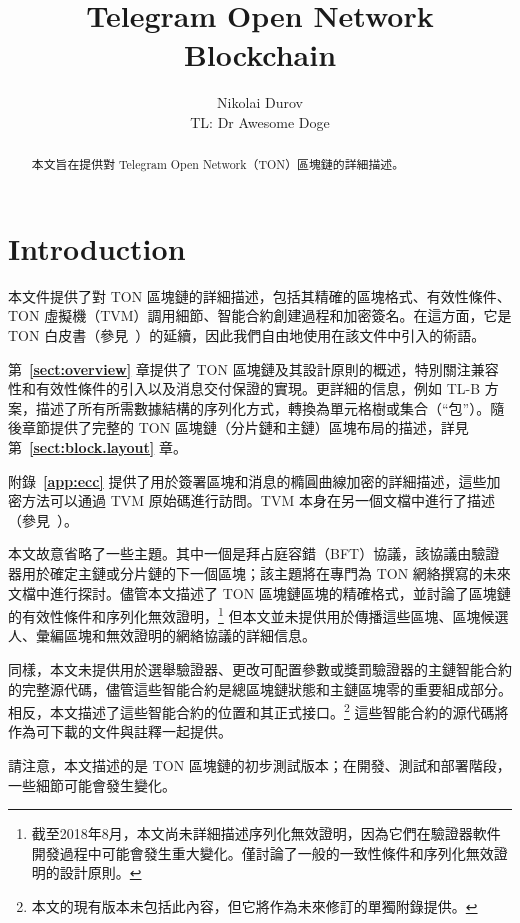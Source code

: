 \documentclass[12pt,oneside]{article}
\title{Telegram Open Network Blockchain}
\author{Nikolai Durov\\
TL: Dr Awesome Doge}
\def\refpoint#1{{\rm\textbf{\ref{#1}}}}
\let\ptref=\refpoint
\def\markbothsame#1{\fancyhead[C]{#1}}
\begin{document}
\maketitle

\begin{abstract}
本文旨在提供對 Telegram Open Network（TON）區塊鏈的詳細描述。
\end{abstract}

\section*{Introduction}
\markbothsame{Introduction}

本文件提供了對 TON 區塊鏈的詳細描述，包括其精確的區塊格式、有效性條件、TON 虛擬機（TVM）調用細節、智能合約創建過程和加密簽名。在這方面，它是 TON 白皮書（參見~\cite{TON}）的延續，因此我們自由地使用在該文件中引入的術語。

第~\ptref{sect:overview} 章提供了 TON 區塊鏈及其設計原則的概述，特別關注兼容性和有效性條件的引入以及消息交付保證的實現。更詳細的信息，例如 TL-B 方案，描述了所有所需數據結構的序列化方式，轉換為單元格樹或集合（“包”）。隨後章節提供了完整的 TON 區塊鏈（分片鏈和主鏈）區塊布局的描述，詳見第~\ptref{sect:block.layout} 章。

附錄~\ptref{app:ecc} 提供了用於簽署區塊和消息的橢圓曲線加密的詳細描述，這些加密方法可以通過 TVM 原始碼進行訪問。TVM 本身在另一個文檔中進行了描述（參見~\cite{TVM}）。

本文故意省略了一些主題。其中一個是拜占庭容錯（BFT）協議，該協議由驗證器用於確定主鏈或分片鏈的下一個區塊；該主題將在專門為 TON 網絡撰寫的未來文檔中進行探討。儘管本文描述了 TON 區塊鏈區塊的精確格式，並討論了區塊鏈的有效性條件和序列化無效證明，\footnote{截至2018年8月，本文尚未詳細描述序列化無效證明，因為它們在驗證器軟件開發過程中可能會發生重大變化。僅討論了一般的一致性條件和序列化無效證明的設計原則。} 但本文並未提供用於傳播這些區塊、區塊候選人、彙編區塊和無效證明的網絡協議的詳細信息。

同樣，本文未提供用於選舉驗證器、更改可配置參數或獎罰驗證器的主鏈智能合約的完整源代碼，儘管這些智能合約是總區塊鏈狀態和主鏈區塊零的重要組成部分。相反，本文描述了這些智能合約的位置和其正式接口。\footnote{本文的現有版本未包括此內容，但它將作為未來修訂的單獨附錄提供。} 這些智能合約的源代碼將作為可下載的文件與註釋一起提供。

請注意，本文描述的是 TON 區塊鏈的初步測試版本；在開發、測試和部署階段，一些細節可能會發生變化。

\clearpage
\tableofcontents
\end{document}
